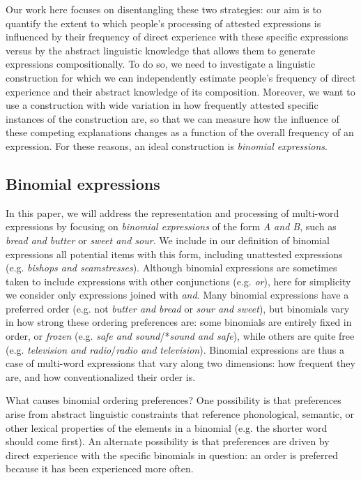 \documentclass[authoryear]{elsarticle}
\begin{document}
Our work here focuses on disentangling these two strategies: our aim is to quantify the extent to which people's processing of attested expressions is influenced by their frequency of direct experience with these specific expressions versus by the abstract linguistic knowledge that allows them to generate expressions compositionally. To do so, we need to investigate a linguistic construction for which we can independently estimate people's frequency of direct experience and their abstract knowledge of its composition. Moreover, we want to use a construction with wide variation in how frequently attested specific instances of the construction are, so that we can measure how the influence of these competing explanations changes as a function of the overall frequency of an expression. For these reasons, an ideal construction is \emph{binomial expressions}.
	


\subsection{Binomial expressions}
In this paper, we will address the representation and processing of multi-word expressions by focusing on \emph{binomial expressions} of the form \emph{A and B}, such as \emph{bread and butter} or \emph{sweet and sour}. We include in our definition of binomial expressions all potential items with this form, including unattested expressions (e.g. \emph{bishops and seamstresses}). Although binomial expressions are sometimes taken to include expressions with other conjunctions (e.g. \emph{or}), here for simplicity we consider only expressions joined with \emph{and}. Many binomial expressions have a preferred order (e.g. not \emph{butter and bread} or \emph{sour and sweet}), but binomials vary in how strong these ordering preferences are: some binomials are entirely fixed in order, or \emph{frozen} (e.g. \emph{safe and sound}/*\emph{sound and safe}), while others are quite free (e.g. \emph{television and radio}/\emph{radio and television}). Binomial expressions are thus a case of multi-word expressions that vary along two dimensions: how frequent they are, and how conventionalized their order is.

What causes binomial ordering preferences? One possibility is that preferences arise from abstract linguistic constraints that reference phonological, semantic, or other lexical properties of the elements in a binomial (e.g. the shorter word should come first). An alternate possibility is that preferences are driven by direct experience with the specific binomials in question: an order is preferred because it has been experienced more often.
\end{document}
